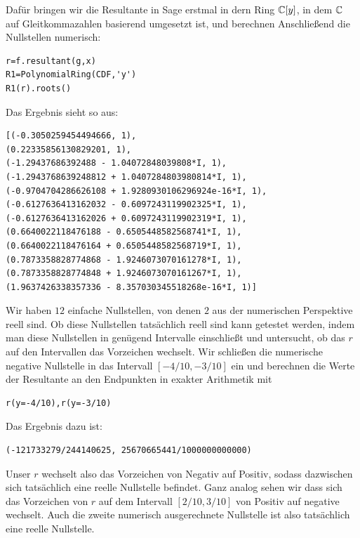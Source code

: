 \documentclass[11pt]{article}
\numberwithin{equation}{section}
\begin{document}
\begin{beispiel}
	Dafür bringen wir die Resultante in Sage erstmal in dern Ring $\mathbb{C}[y]$, in dem $\mathbb{C}$ auf Gleitkommazahlen basierend umgesetzt ist, und berechnen Anschließend die Nullstellen numerisch: 
\begin{lstlisting}
r=f.resultant(g,x)
R1=PolynomialRing(CDF,'y')
R1(r).roots()
\end{lstlisting} 
Das Ergebnis sieht so aus: 
\begin{lstlisting} 
[(-0.3050259454494666, 1),
(0.22335856130829201, 1),
(-1.29437686392488 - 1.04072848039808*I, 1),
(-1.2943768639248812 + 1.0407284803980814*I, 1),
(-0.9704704286626108 + 1.9280930106296924e-16*I, 1),
(-0.6127636413162032 - 0.6097243119902325*I, 1),
(-0.6127636413162026 + 0.6097243119902319*I, 1),
(0.6640022118476188 - 0.6505448582568741*I, 1),
(0.6640022118476164 + 0.6505448582568719*I, 1),
(0.7873358828774868 - 1.9246073070161278*I, 1),
(0.7873358828774848 + 1.9246073070161267*I, 1),
(1.9637426338357336 - 8.357030345518268e-16*I, 1)]
\end{lstlisting} 
Wir haben $12$ einfache Nullstellen, von denen $2$ aus der numerischen Perspektive reell sind. Ob diese Nullstellen tatsächlich reell sind kann getestet werden, indem man diese Nullstellen in genügend  Intervalle einschließt und untersucht, ob das $r$ auf  den Intervallen das Vorzeichen wechselt. Wir schließen die numerische negative Nullstelle in das Intervall $[-4/10,-3/10]$ ein und berechnen die Werte der Resultante an den Endpunkten in exakter Arithmetik mit 
\begin{lstlisting} 
r(y=-4/10),r(y=-3/10)
\end{lstlisting} 
Das Ergebnis dazu ist: 
\begin{lstlisting} 
(-121733279/244140625, 25670665441/1000000000000)
\end{lstlisting} 
Unser $r$ wechselt also das Vorzeichen von Negativ auf Positiv, sodass dazwischen sich tatsächlich eine reelle Nullstelle befindet. Ganz analog sehen wir dass sich das Vorzeichen von $r$ auf dem Intervall $[2/10,3/10]$ von Positiv auf negative wechselt. Auch die zweite numerisch ausgerechnete Nullstelle ist also tatsächlich eine reelle Nullstelle. 


\end{beispiel}
\end{document}
